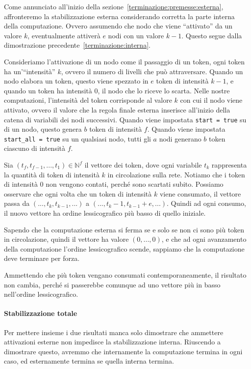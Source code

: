 \documentclass[12pt, a4paper]{article}
\begin{document}
    Come annunciato all'inizio della sezione~\ref{terminazione:premesse:esterna}, affronteremo la stabilizzazione esterna considerando corretta la parte interna della computazione. Ovvero assumendo che nodo che viene ``attivato'' da un valore $k$, eventualmente attiverà $e$ nodi con un valore $k-1$. Questo segue dalla dimostrazione precedente~\ref{terminazione:interna}.

    Consideriamo l'attivazione di un nodo come il passaggio di un token, ogni token ha un'``intensità'' $k$, ovvero il numero di livelli che può attraversare. Quando un nodo elabora un token, questo viene spezzato in $e$ token di intensità $k-1$, e quando un token ha intensità $0$, il nodo che lo riceve lo scarta.
    Nelle nostre computazioni, l'intensità del token corrisponde al valore $k$ con cui il nodo viene attivato, ovvero il valore che la regola finale esterna inserisce all'inizio della catena di variabili dei nodi successivi. Quando viene impostata \lstinline{start = true} su di un nodo, questo genera $b$ token di intensità $f$. Quando viene impostata \lstinline{start_all = true} su un qualsiasi nodo, tutti gli $a$ nodi generano $b$ token ciascuno di intensità $f$.

    Sia $(t_f,t_{f-1},...,t_1)\in\mathbb{N}^f$ il vettore dei token, dove ogni variabile $t_k$ rappresenta la quantità di token di intensità $k$ in circolazione sulla rete. Notiamo che i token di intensità $0$ non vengono contati, perché sono scartati subito.
    Possiamo osservare che ogni volta che un token di intensità $k$ viene consumato, il vettore passa da $(...,t_k,t_{k-1},...)$ a $(...,t_k-1,t_{k-1}+e,...)$. Quindi ad ogni consumo, il nuovo vettore ha ordine lessicografico più basso di quello iniziale.

    Sapendo che la computazione esterna si ferma se e solo se non ci sono più token in circolazione, quindi il vettore ha valore $(0,...,0)$, e che ad ogni avanzamento della computazione l'ordine lessicografico scende, sappiamo che la computazione deve terminare per forza.

    Ammettendo che più token vengano consumati contemporaneamente, il risultato non cambia, perché si passerebbe comunque ad uno vettore più in basso nell'ordine lessicografico.

    \paragraph{Stabilizzazione totale}\label{terminazione:totale}

    Per mettere insieme i due risultati manca solo dimostrare che ammettere attivazioni esterne non impedisce la stabilizzazione interna. Riuscendo a dimostrare questo, avremmo che internamente la computazione termina in ogni caso, ed esternamente termina se quella interna termina.
\end{document}
